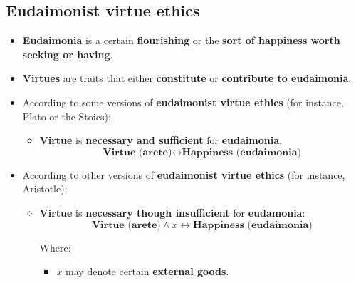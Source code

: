 \documentclass[11pt]{article}
\begin{document}
\subsection{Eudaimonist virtue ethics}
\label{sec:org7186a44}
\begin{itemize}
\item \textbf{Eudaimonia} is a certain \textbf{flourishing} or the \textbf{sort of happiness worth seeking or having}.
\item \textbf{Virtues} are traits that either \textbf{constitute} or \textbf{contribute to eudaimonia}.
\item According to some versions of \textbf{eudaimonist virtue ethics} (for instance, Plato or the Stoics):
\begin{itemize}
\item \textbf{Virtue} is \textbf{necessary and sufficient} for \textbf{eudaimonia}.
\[\textbf{Virtue (arete)} \leftrightarrow \textbf{Happiness (eudaimonia)}\]
\end{itemize}
\item According to other versions of \textbf{eudaimonist virtue ethics} (for instance, Aristotle):
\begin{itemize}
\item \textbf{Virtue} is \textbf{necessary though insufficient} for \textbf{eudamonia}:
\[\textbf{Virtue (arete)} \wedge x \leftrightarrow \textbf{Happiness (eudaimonia)}\]

Where:
\begin{itemize}
\item \(x\) may denote certain \textbf{external goods}.
\end{itemize}
\end{itemize}
\end{itemize}

 \newpage
\end{document}
